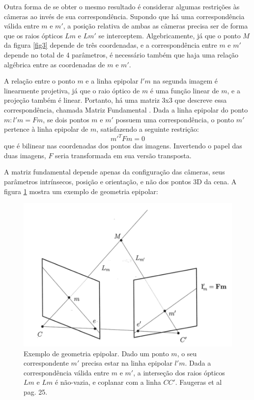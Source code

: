 Outra forma de se obter o mesmo resultado é considerar algumas restrições às câmeras ao invés de sua correspondência. Supondo que há uma correspondência válida entre $m$ e $m'$, a posição relativa de ambas as câmeras precisa ser de forma que os raios ópticos $Lm$ e $Lm'$ se interceptem. Algebricamente, já que o ponto $M$ da figura \ref{fig3} depende de três coordenadas, e a correspondência entre $m$ e $m'$ depende no total de 4 parâmetros, é necessário também que haja uma relação algébrica entre as coordenadas de $m$ e $m'$.

A relação entre o ponto $m$ e a linha epipolar $l'm$ na segunda imagem é linearmente projetiva, já que o raio óptico de $m$ é uma função linear de $m$, e a projeção também é linear. Portanto, há uma matriz 3x3 que descreve essa correspondência, chamada Matriz Fundamental \cite{Faugeras-Geometry}. Dada a linha epipolar do ponto $m: l'm = Fm$, se dois pontos $m$ e $m'$ possuem uma correspondência, o ponto $m'$ pertence à linha epipolar de $m$, satisfazendo a seguinte restrição: 
\begin{equation}\label{eq4}m'^{T}Fm = 0\end{equation} que é bilinear nas coordenadas dos pontos das imagens. Invertendo o papel das duas imagens, $F$ seria transformada em sua versão transposta.

A matriz fundamental depende apenas da configuração das câmeras, seus parâmetros intrínsecos, posição e orientação, e não dos pontos 3D da cena. A figura \ref{fig4} mostra um exemplo de geometria epipolar:

\begin{figure}
	\centering
		\includegraphics{Imagens/figura2-4.png}
	\caption{Exemplo de geometria epipolar. Dado um ponto $m$, o seu correspondente $m'$ precisa estar na linha epipolar $l'm$. Dada a correspondência válida entre $m$ e $m'$, a interseção dos raios ópticos $Lm$ e $Lm$ é não-vazia, e coplanar com a linha $CC'$. Faugeras et al \cite{Faugeras-Geometry} pag. 25.}
	\label{fig4}
\end{figure}

